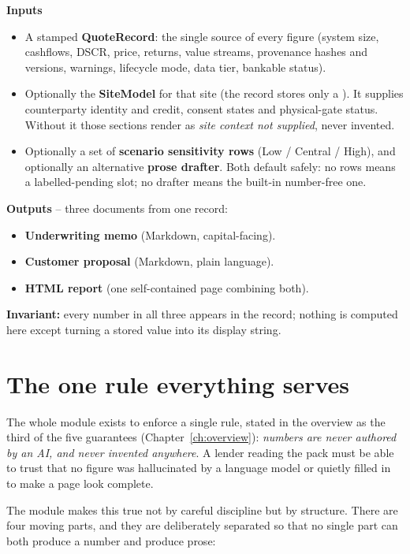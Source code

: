 \begin{contract}
\textbf{Inputs}
\begin{itemize}
  \item A stamped \textbf{QuoteRecord}: the single source of every figure (system size, cashflows, DSCR, price, returns, value streams, provenance hashes and versions, warnings, lifecycle mode, data tier, bankable status).
  \item Optionally the \textbf{SiteModel} for that site (the record stores only a ). It supplies counterparty identity and credit, consent states and physical-gate status. Without it those sections render as \emph{site context not supplied}, never invented.
  \item Optionally a set of \textbf{scenario sensitivity rows} (Low / Central / High), and optionally an alternative \textbf{prose drafter}. Both default safely: no rows means a labelled-pending slot; no drafter means the built-in number-free one.
\end{itemize}
\textbf{Outputs} -- three documents from one record:
\begin{itemize}
  \item \textbf{Underwriting memo} (Markdown, capital-facing).
  \item \textbf{Customer proposal} (Markdown, plain language).
  \item \textbf{HTML report} (one self-contained page combining both).
\end{itemize}
\textbf{Invariant:} every number in all three appears in the record; nothing is computed here except turning a stored value into its display string.
\end{contract}

\section{The one rule everything serves}

The whole module exists to enforce a single rule, stated in the overview as the third of the five guarantees (Chapter~\ref{ch:overview}): \emph{numbers are never authored by an AI, and never invented anywhere}. A lender reading the pack must be able to trust that no figure was hallucinated by a language model or quietly filled in to make a page look complete.

The module makes this true not by careful discipline but by structure. There are four moving parts, and they are deliberately separated so that no single part can both produce a number and produce prose:

